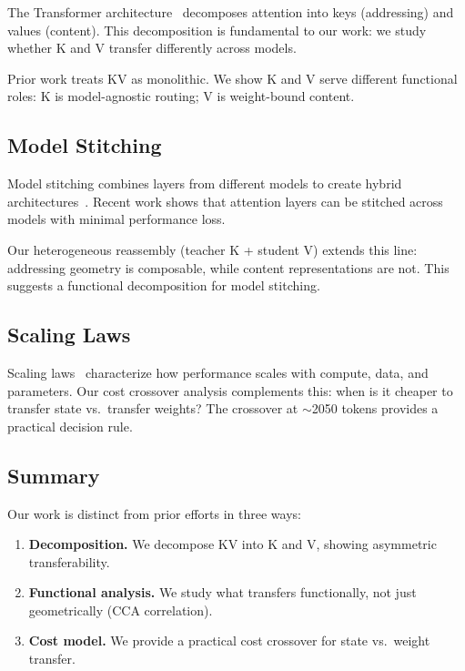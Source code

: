The Transformer architecture~\cite{vaswani2017attention}
decomposes attention into keys (addressing) and values (content).
This decomposition is fundamental to our work:
we study whether K and V transfer differently across models.

Prior work treats KV as monolithic.
We show K and V serve different functional roles:
K is model-agnostic routing; V is weight-bound content.

\subsection{Model Stitching}

Model stitching combines layers from different models
to create hybrid architectures~\cite{bansal2020could}.
Recent work shows that attention layers can be stitched
across models with minimal performance loss.

Our heterogeneous reassembly (teacher K + student V)
extends this line:
addressing geometry is composable,
while content representations are not.
This suggests a functional decomposition for model stitching.

\subsection{Scaling Laws}

Scaling laws~\cite{kaplan2020scaling,hoffmann2022chinchilla}
characterize how performance scales with compute, data, and parameters.
Our cost crossover analysis complements this:
when is it cheaper to transfer state vs.\ transfer weights?
The crossover at $\sim$2050 tokens provides a practical decision rule.

\subsection{Summary}

Our work is distinct from prior efforts in three ways:
\begin{enumerate}
  \item \textbf{Decomposition.} We decompose KV into K and V,
    showing asymmetric transferability.
  \item \textbf{Functional analysis.} We study what transfers functionally,
    not just geometrically (CCA correlation).
  \item \textbf{Cost model.} We provide a practical cost crossover
    for state vs.\ weight transfer.
\end{enumerate}
